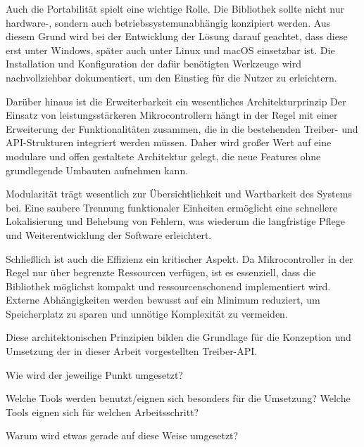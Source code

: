 Auch die Portabilität spielt eine wichtige Rolle.
Die Bibliothek sollte nicht nur hardware-, sondern auch betriebssystemunabhängig konzipiert werden.
Aus diesem Grund wird bei der Entwicklung der Lösung darauf geachtet, dass diese erst unter Windows, später auch unter Linux und macOS einsetzbar ist.
Die Installation und Konfiguration der dafür benötigten Werkzeuge wird nachvollziehbar dokumentiert, um den Einstieg für die Nutzer zu erleichtern.

Darüber hinaus ist die Erweiterbarkeit ein wesentliches Architekturprinzip
Der Einsatz von leistungsstärkeren Mikrocontrollern hängt in der Regel mit einer Erweiterung der Funktionalitäten zusammen, die in die bestehenden Treiber- und API-Strukturen integriert werden müssen.
Daher wird großer Wert auf eine modulare und offen gestaltete Architektur gelegt, die neue Features ohne grundlegende Umbauten aufnehmen kann.

Modularität trägt wesentlich zur Übersichtlichkeit und Wartbarkeit des Systems bei. 
Eine saubere Trennung funktionaler Einheiten ermöglicht eine schnellere Lokalisierung und Behebung von Fehlern, was wiederum die langfristige Pflege und Weiterentwicklung der Software erleichtert.

Schließlich ist auch die Effizienz ein kritischer Aspekt.
Da Mikrocontroller in der Regel nur über begrenzte Ressourcen verfügen, ist es essenziell, dass die Bibliothek möglichst kompakt und ressourcenschonend implementiert wird. 
Externe Abhängigkeiten werden bewusst auf ein Minimum reduziert, um Speicherplatz zu sparen und unnötige Komplexität zu vermeiden.

Diese architektonischen Prinzipien bilden die Grundlage für die Konzeption und Umsetzung der in dieser Arbeit vorgestellten Treiber-API.

Wie wird der jeweilige Punkt umgesetzt?

Welche Tools werden benutzt/eignen sich besonders für die Umsetzung?
Welche Tools eignen sich für welchen Arbeitsschritt?

Warum wird etwas gerade auf diese Weise umgesetzt?





























